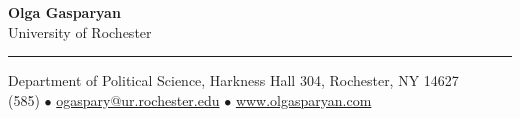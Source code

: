 \documentclass[letterpaper,11pt,oneside]{article}
\begin{document}
\begin{center}
  \noindent \Large{\textbf{Olga Gasparyan}}  \\
\vspace{0.3ex}
\Large{University of Rochester}
\end{center}
\begin{center}
\noindent\rule{16cm}{0.4pt}
\end{center}
\normalsize



\begin{center}
Department of Political Science, Harkness Hall 304, Rochester, NY 14627 \\
(585) $\bullet$  \href{mailto:ogaspary@ur.rochester.edu}{ogaspary@ur.rochester.edu} $\bullet$ \href{www.olgasparyan.com}{www.olgasparyan.com}
\\

\end{center}

\vspace{1em}

\end{document}
